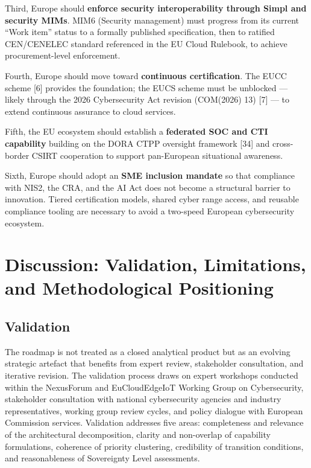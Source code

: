 \documentclass{ieeeaccess}
\begin{document}
Third, Europe should \textbf{enforce security interoperability through
Simpl and security MIMs}. MIM6 (Security management) must progress from
its current ``Work item'' status to a formally published specification,
then to ratified CEN/CENELEC standard referenced in the EU Cloud
Rulebook, to achieve procurement-level enforcement.

Fourth, Europe should move toward \textbf{continuous certification}. The
EUCC scheme {[}6{]} provides the foundation; the EUCS scheme must be
unblocked --- likely through the 2026 Cybersecurity Act revision
(COM(2026) 13) {[}7{]} --- to extend continuous assurance to cloud
services.

Fifth, the EU ecosystem should establish a \textbf{federated SOC and CTI
capability} building on the DORA CTPP oversight framework {[}34{]} and
cross-border CSIRT cooperation to support pan-European situational
awareness.

Sixth, Europe should adopt an \textbf{SME inclusion mandate} so that
compliance with NIS2, the CRA, and the AI Act does not become a
structural barrier to innovation. Tiered certification models, shared
cyber range access, and reusable compliance tooling are necessary to
avoid a two-speed European cybersecurity ecosystem.

\section{Discussion: Validation, Limitations, and Methodological
Positioning}\label{discussion-validation-limitations-and-methodological-positioning}

\subsection{Validation}\label{validation}

The roadmap is not treated as a closed analytical product but as an
evolving strategic artefact that benefits from expert review,
stakeholder consultation, and iterative revision. The validation process
draws on expert workshops conducted within the NexusForum and
EuCloudEdgeIoT Working Group on Cybersecurity, stakeholder consultation
with national cybersecurity agencies and industry representatives,
working group review cycles, and policy dialogue with European
Commission services. Validation addresses five areas: completeness and
relevance of the architectural decomposition, clarity and non-overlap of
capability formulations, coherence of priority clustering, credibility
of transition conditions, and reasonableness of Sovereignty Level
assessments.
\end{document}
